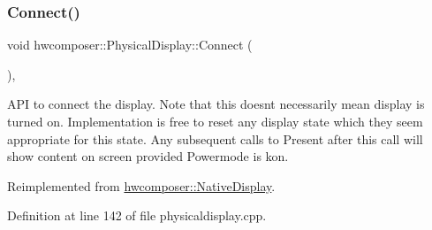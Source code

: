 \subsubsection{\texorpdfstring{Connect()}{Connect()}}
{\footnotesize\ttfamily void hwcomposer\+::\+Physical\+Display\+::\+Connect (\begin{DoxyParamCaption}{ }\end{DoxyParamCaption})\hspace{0.3cm}{\ttfamily [override]}, {\ttfamily [virtual]}}

A\+PI to connect the display. Note that this doesn\textquotesingle{}t necessarily mean display is turned on. Implementation is free to reset any display state which they seem appropriate for this state. Any subsequent calls to Present after this call will show content on screen provided Powermode is kon. 

Reimplemented from \mbox{\hyperlink{classhwcomposer_1_1NativeDisplay_a5c40ff028a9d547b1775b1c6f40df868}{hwcomposer\+::\+Native\+Display}}.



Definition at line 142 of file physicaldisplay.\+cpp.


